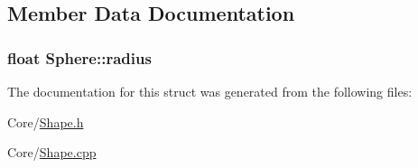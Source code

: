 \subsection{Member Data Documentation}
\subsubsection[{\texorpdfstring{radius}{radius}}]{\setlength{\rightskip}{0pt plus 5cm}float Sphere\+::radius}\hypertarget{structSphere_ae6f42f0da6679a2f0b4a22681ccccf38}{}\label{structSphere_ae6f42f0da6679a2f0b4a22681ccccf38}


The documentation for this struct was generated from the following files\+:\begin{DoxyCompactItemize}
\item 
Core/\hyperlink{Shape_8h}{Shape.\+h}\item 
Core/\hyperlink{Shape_8cpp}{Shape.\+cpp}\end{DoxyCompactItemize}
